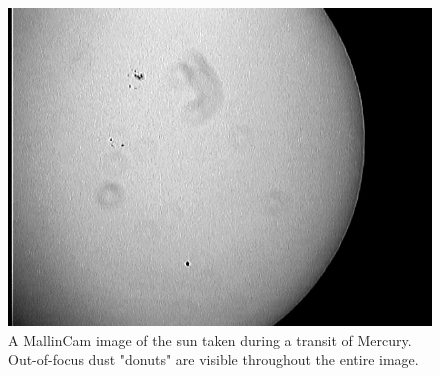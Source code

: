 \documentclass[12pt,titlepage]{article}
\begin{document}
\begin{figure}[H] 
	\begin{center}
		\includegraphics[width=.95\textwidth]{./images/MallinCam/dust/mercury_transit.jpg} 
		\caption{A MallinCam image of the sun taken during a transit of Mercury.
		Out-of-focus dust "donuts" are visible throughout the entire image.}
		\label{sundust}
	\end{center}
\end{figure}
\end{document}
